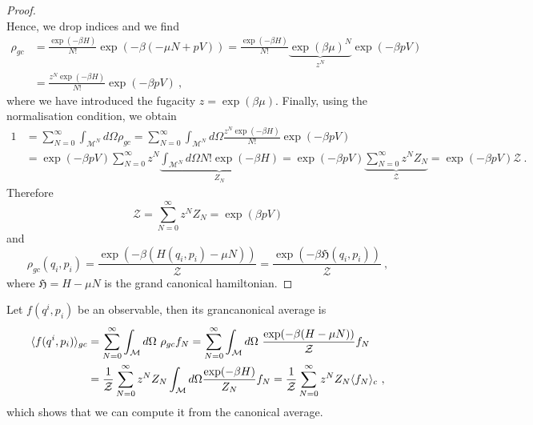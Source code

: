 \begin{proof}
\begin{equation*}
        \end{equation*}
        Hence, we drop indices and we find 
        \begin{equation*}
        \begin{aligned}
            \rho_{gc} & = \frac{\exp(-\beta H)}{N!} \exp (-\beta (-\mu N + p V)) = \frac{\exp(-\beta H)}{N!} \underbrace{\exp ( \beta \mu)^N}_{z^N} \exp(-\beta p V) \\ & = \frac{z^N \exp(-\beta H)}{N!} \exp(-\beta p V) ~,
        \end{aligned}
        \end{equation*}
        where we have introduced the fugacity $z = \exp(\beta \mu)$.
        Finally, using the normalisation condition, we obtain
        \begin{equation*}
        \begin{aligned}
            1 & = \sum_{N=0}^{\infty} \int_{\mathcal M^N} d\Omega \rho_{gc} = \sum_{N=0}^{\infty} \int_{\mathcal M^N} d\Omega \frac{z^N \exp(-\beta H)}{N!} \exp(-\beta p V) \\ & = \exp(-\beta p V) \sum_{N=0}^{\infty} z^N \underbrace{\int_{\mathcal M^N} {d\Omega}{N!} \exp(- \beta H)}_{Z_N} = \exp(-\beta p V) \underbrace{\sum_{N=0}^{\infty} z^N Z_N}_{\mathcal Z}= \exp(-\beta p V) \mathcal Z ~.
        \end{aligned}
        \end{equation*}
        Therefore
        \begin{equation}\label{proof5}
            \mathcal Z = \sum_{N=0}^{\infty} z^N Z_N = \exp(\beta p V)
        \end{equation}
        and 
        \begin{equation*}
            \rho_{gc} (q_i, p_i) = \frac{\exp(-\beta (H(q_i, p_i) - \mu N))}{\mathcal Z} = \frac{\exp(-\beta \mathfrak H(q_i, p_i) )}{\mathcal Z} ~,
        \end{equation*}
        where $\mathfrak H = H - \mu N$ is the grand canonical hamiltonian.
    \end{proof}

    Let $f(q^i, p_i)$ be an observable, then its grancanonical average is 
    \begin{equation*}\label{gc:av}
    \begin{aligned}
        \langle f(q^i, p_i)\rangle_{gc} & = \sum_{N = 0}^{\infty} \int_{\mathcal M} d\Omega ~ \rho_{gc} f_N = \sum_{N = 0}^{\infty} \int_{\mathcal M} d\Omega ~ \frac{\exp (-\beta (H - \mu N ))}{\mathcal Z} f_N \\ & = \frac{1}{\mathcal Z} \sum_{N=0}^{\infty} z^N Z_N \int_{\mathcal M} d\Omega \frac{\exp(-\beta H)}{Z_N} f_N = \frac{1}{\mathcal Z} \sum_{N=0}^{\infty} z^N Z_N \langle f_N\rangle_{c} ~,
    \end{aligned}
    \end{equation*}
    which shows that we can compute it from the canonical average.

